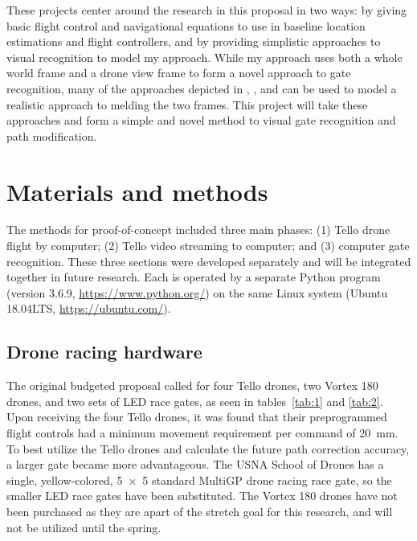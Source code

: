 \documentclass[onecolumn,10pt]{IEEEtran}
\begin{document}
These projects center around the research in this proposal in two ways: by giving basic flight control and navigational equations to use in baseline location estimations and flight controllers, and by providing simplistic approaches to visual recognition to model my approach. While my approach uses both a whole world frame and a drone view frame to form a novel approach to gate recognition, many of the approaches depicted in \cite{zhilenkov2018use}, \cite{jung2018perception}, and \cite{jung2018direct} can be used to model a realistic approach to melding the two frames. This project will take these approaches and form a simple and novel method to visual gate recognition and path modification.







\section{Materials and methods}
The methods for proof-of-concept included three main phases: (1) Tello drone flight by computer; (2) Tello video streaming to computer; and (3) computer gate recognition. These three sections were developed separately and will be integrated together in future research. Each is operated by a separate Python program (version 3.6.9, \url{https://www.python.org/}) on the same Linux system (Ubuntu 18.04LTS, \url{https://ubuntu.com/}).

\subsection{Drone racing hardware}
The original budgeted proposal called for four Tello drones, two Vortex 180 drones, and two sets of LED race gates, as seen in tables~\ref{tab:1} and \ref{tab:2}. Upon receiving the four Tello drones, it was found that their preprogrammed flight controls had a minimum movement requirement per command of \SI{20}{\milli\meter}. To best utilize the Tello drones and calculate the future path correction accuracy, a larger gate became more advantageous. The USNA School of Drones has a single, yellow-colored, \SI{5x5}{\foot} standard MultiGP drone racing race gate, so the smaller LED race gates have been substituted. The Vortex 180 drones have not been purchased as they are apart of the stretch goal for this research, and will not be utilized until the spring.
\end{document}
